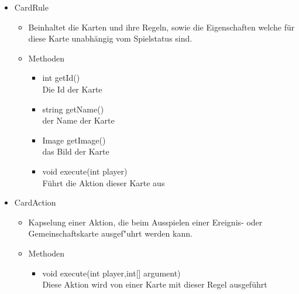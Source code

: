\documentclass[a4paper,10pt]{article}
\begin{document}
\begin{itemize}
\item CardRule
\begin{itemize}
\item Beinhaltet die Karten und ihre Regeln, sowie die Eigenschaften welche für diese Karte unabhängig vom Spielstatus sind.

\item Methoden
\begin{itemize}
\item int getId()
\\Die Id der Karte
\item string getName()
\\der Name der Karte
\item Image getImage()
\\das Bild der Karte
\item void execute(int player)
\\Führt die Aktion dieser Karte aus
\end{itemize}
\end{itemize}

\item CardAction
\begin{itemize}
\item Kapselung einer Aktion, die beim Ausspielen einer Ereignis- oder Gemeinschaftskarte ausgef"uhrt werden kann.

\item Methoden
\begin{itemize}
\item void execute(int player,int[] argument)
\\Diese Aktion wird von einer Karte mit dieser Regel ausgeführt
\end{itemize}
\end{itemize}


\end{itemize}
\end{document}

